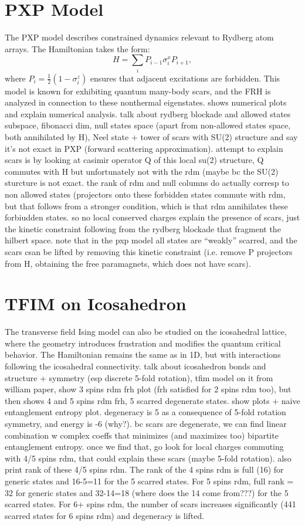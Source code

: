 \documentclass{article}
\begin{document}
\section{PXP Model}
The PXP model describes constrained dynamics relevant to Rydberg atom arrays. The Hamiltonian takes the form:
\begin{equation}
    H = \sum_i P_{i-1} \sigma^x_i P_{i+1},
\end{equation}
where $P_i = \frac{1}{2} (1 - \sigma^z_i)$ ensures that adjacent excitations are forbidden. This model is known for exhibiting quantum many-body scars, and the FRH is analyzed in connection to these nonthermal eigenstates. shows numerical plots and explain numerical analysis. talk about rydberg blockade and allowed states subspace, fibonacci dim, null states space (apart from non-allowed states space, both annihilated by H), Neel state + tower of scars with SU(2) structure and say it's not exact in PXP (forward scattering approximation). attempt to explain scars is by looking at casimir operator Q of this local su(2) structure, Q commutes with H but unfortunately not with the rdm (maybe bc the SU(2) sturcture is not exact. the rank of rdm and null columns do actually corresp to non allowed states (projectors onto these forbidden states commute with rdm, but that follows from a stronger condition, which is that rdm annihilates these forbiudden states. so no local conserved charges explain the presence of scars, just the kinetic constraint following from the rydberg blockade that fragment the hilbert space. note that in the pxp model all states are ``weakly'' scarred, and the scars csan be lifted by removing this kinetic constraint (i.e. remove P projectors from H, obtaining the free paramagnets, which does not have scars).

\section{TFIM on Icosahedron}
The transverse field Ising model can also be studied on the icosahedral lattice, where the geometry introduces frustration and modifies the quantum critical behavior. The Hamiltonian remains the same as in 1D, but with interactions following the icosahedral connectivity. talk about icosahedron bonds  and structure + symmetry (esp discrete 5-fold rotation), tfim model on it from william paper, show 3 spins rdm frh plot (frh satisfied for  2 spins rdm too), but then shows 4 and 5 spins rdm frh, 5 scarred degenerate states. show plots + naive entanglement entropy plot. degeneracy is 5 as a consequence of 5-fold rotation symmetry, and energy is -6 (why?). bc scars are  degenerate, we can find linear combination w complex coeffs that minimizes (and maximizes too) bipartite entanglement entropy. once we find that, go look for local charges commuting with 4/5 spins rdm, that could explain these scars (maybe 5-fold rotation). also print rank of these 4/5 spins rdm. The rank of the 4 spins rdm is full (16) for generic states and 16-5=11 for the 5 scarred states. For 5 spins rdm, full rank = 32 for generic states and 32-14=18 (where does the 14 come from???) for the 5 scarred states. For 6+ spins rdm, the number of scars increases significantly (441 scarred states for 6 spins rdm) and degeneracy is lifted.
\end{document}
